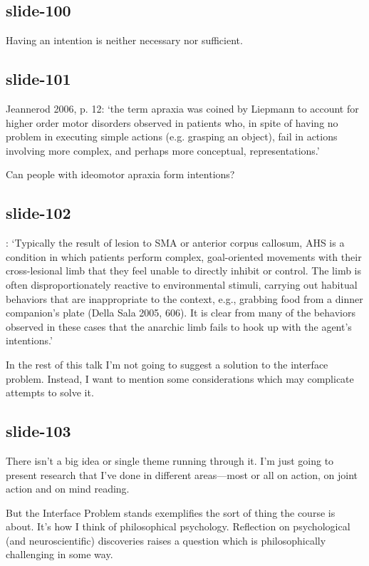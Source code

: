 \documentclass[12pt,\papersize]{extarticle}
\begin{document}
\subsection{slide-100}
Having an intention is neither necessary nor sufficient.
 
\subsection{slide-101}
Jeannerod 2006, p. 12:
‘the term apraxia was coined by Liepmann to account for higher order motor
disorders observed in patients who, in spite of having no problem in executing
simple actions (e.g. grasping an object), fail in actions involving more
complex, and perhaps more conceptual, representations.’
 
Can people with ideomotor apraxia form intentions?
 
\subsection{slide-102}
\citep[p.~7]{mylopoulos:2016_intentions}: ‘Typically the result of lesion
to SMA or anterior corpus callosum, AHS is a condition in which patients
perform complex, goal-oriented movements with their cross-lesional limb
that they feel unable to directly inhibit or control. The limb is often
disproportionately reactive to environmental stimuli, carrying out
habitual behaviors that are inappropriate to the context, e.g., grabbing
food from a dinner companion’s plate (Della Sala 2005, 606). It is clear
from many of the behaviors observed in these cases that the anarchic limb
fails to hook up with the agent’s intentions.’
 
In the rest of this talk I’m not going to suggest a solution to the interface problem.
Instead, I want to mention some considerations
which may complicate attempts to solve it.
 
\subsection{slide-103}
There isn’t a big idea or single theme running through it.
I’m just going to present research that I’ve done in different areas---most or all
on action, on joint action and on mind reading.
 
But the Interface Problem stands exemplifies the sort of thing the course is about.
It’s how I think of philosophical psychology.
Reflection on psychological (and neuroscientific) discoveries raises a question
which is philosophically challenging in some way.
 
\end{document}
